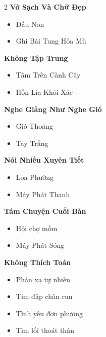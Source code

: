 \begin{multicols}{2}
\textbf{\color{chapterline}Vở Sạch Và Chữ Đẹp}
\begin{itemize}[leftmargin=1.2em, itemsep=0.1em, label=\textcolor{titlecolor}{\tiny$\blacksquare$}]
  \item Đầu Non
  \item Ghi Bài Tung Hỏa Mù
\end{itemize}
\vspace{0.8em}
\textbf{\color{chapterline}Không Tập Trung}
\begin{itemize}[leftmargin=1.2em, itemsep=0.1em, label=\textcolor{titlecolor}{\tiny$\blacksquare$}]
  \item Tâm Trên Cành Cây
  \item Hồn Lìa Khỏi Xác
\end{itemize}
\vspace{0.8em}
\textbf{\color{chapterline}Nghe Giảng Như Nghe Gió}
\begin{itemize}[leftmargin=1.2em, itemsep=0.1em, label=\textcolor{titlecolor}{\tiny$\blacksquare$}]
  \item Gió Thoảng
  \item Tay Trắng
\end{itemize}
\vspace{0.8em}
\textbf{\color{chapterline}Nói Nhiều Xuyên Tiết}
\begin{itemize}[leftmargin=1.2em, itemsep=0.1em, label=\textcolor{titlecolor}{\tiny$\blacksquare$}]
  \item Loa Phường
  \item Máy Phát Thanh
\end{itemize}
\vspace{0.8em}
\textbf{\color{chapterline}Tám Chuyện Cuối Bàn}
\begin{itemize}[leftmargin=1.2em, itemsep=0.1em, label=\textcolor{titlecolor}{\tiny$\blacksquare$}]
  \item Hội chợ mồm
  \item Máy Phát Sóng
\end{itemize}
\vspace{0.8em}
\textbf{\color{chapterline}Không Thích Toán}
\begin{itemize}[leftmargin=1.2em, itemsep=0.1em, label=\textcolor{titlecolor}{\tiny$\blacksquare$}]
  \item Phản xạ tự nhiên
  \item Tim đập chân run
  \item Tình yêu đơn phương
  \item Tìm lối thoát thân
\end{itemize}

\end{multicols}
